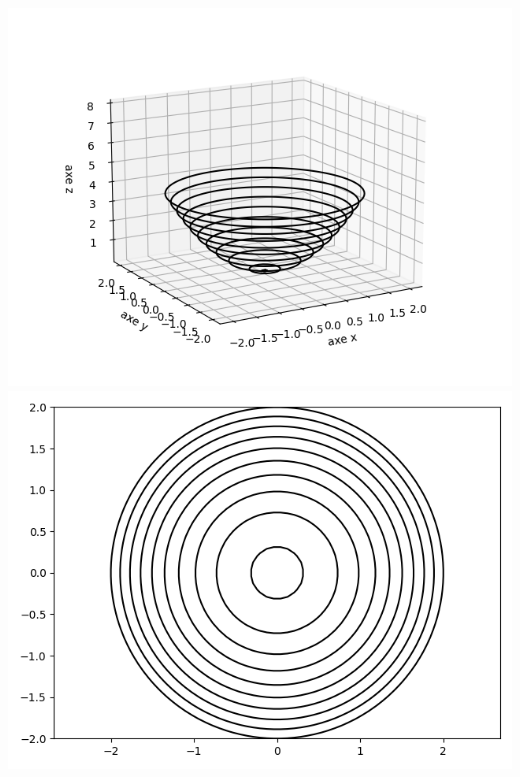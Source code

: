 \begin{exemple}{}{}
\begin{center}
\includegraphics[scale=\myscale,scale=0.5]{figures/fonctions-extrem-1d}
\includegraphics[scale=\myscale,scale=0.5]{figures/fonctions-extrem-1e}
\end{center}


\end{exemple}
	

